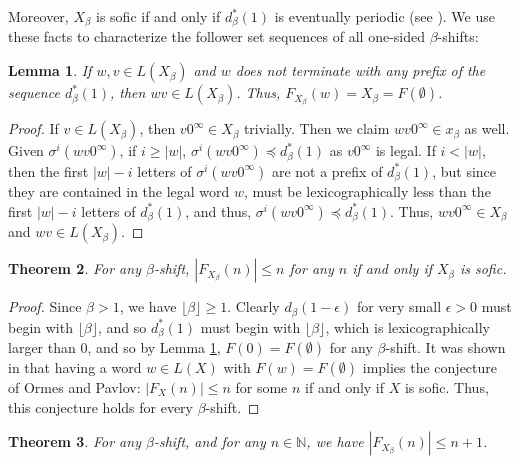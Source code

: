 \documentclass{amsart}
\newtheorem{theorem}{Theorem}[section]
\newtheorem{lemma}[theorem]{Lemma}
\theoremstyle{definition}
\numberwithin{equation}{section}
\begin{document}
Moreover, $X_\beta$ is sofic if and only if $d_\beta^*(1)$ is eventually periodic (see \cite{Blanchard}). We use these facts to characterize the follower set sequences of all one-sided $\beta$-shifts:

\begin{lemma}\label{safewords}
If $w,v \in L(X_\beta)$ and $w$ does not terminate with any prefix of the sequence $d_\beta^* (1)$, then $wv \in L(X_\beta)$. Thus, $F_{X_\beta}(w) = X_\beta = F(\emptyset)$.
\end{lemma}

\begin{proof}
If $v \in L(X_\beta)$, then $v0^\infty \in X_\beta$ trivially. Then we claim $wv0^\infty \in x_\beta$ as well. Given $\sigma^i(wv0^\infty)$, if $i \geq |w|$, $\sigma^i(wv0^\infty) \preceq d_\beta^*(1)$ as $v0^\infty$ is legal. If $i < |w|$, then the first $|w| - i$ letters of $\sigma^i(wv0^\infty)$ are not a prefix of $d_\beta^*(1)$, but since they are contained in the legal word $w$, must be lexicographically less than the first $|w|-i$ letters of $d_\beta^*(1)$, and thus, $\sigma^i(wv0^\infty) \preceq d_\beta^*(1)$. Thus, $wv0^\infty \in X_\beta$ and $wv \in L(X_\beta)$.
\end{proof}

\begin{theorem}\label{FSConj}
For any $\beta$-shift, $|F_{X_\beta}(n)| \leq n$ for any $n$ if and only if $X_\beta$ is sofic.
\end{theorem}

\begin{proof}
Since $\beta > 1$, we have $\lfloor \beta \rfloor \geq 1$. Clearly $d_\beta(1-\epsilon)$ for very small $\epsilon > 0$ must begin with $\lfloor \beta \rfloor$, and so $d_\beta^*(1)$ must begin with $\lfloor \beta \rfloor$, which is lexicographically larger than $0$, and so by Lemma \ref{safewords}, $F(0) = F(\emptyset)$ for any $\beta$-shift. It was shown in \cite{FOP} that having a word $w \in L(X)$ with $F(w)=F(\emptyset)$ implies the conjecture of Ormes and Pavlov: $|F_X(n)| \leq n$ for some $n$ if and only if $X$ is sofic. Thus, this conjecture holds for every $\beta$-shift.
\end{proof}

\begin{theorem}\label{UBFSSbeta}
For any $\beta$-shift, and for any $n \in \mathbb{N}$, we have $|F_{X_\beta}(n)| \leq n + 1$.
\end{theorem}
\end{document}
